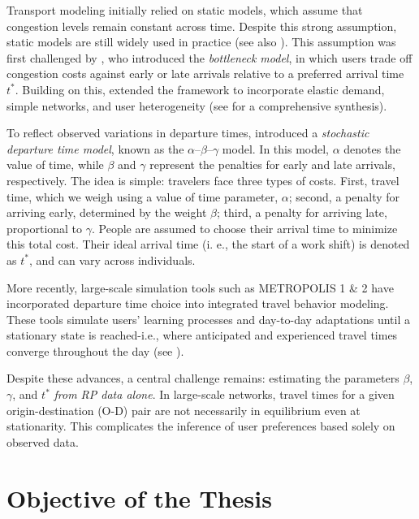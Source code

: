 Transport modeling initially relied on static models, which assume that congestion levels remain constant across time. Despite this strong assumption, static models are still widely used in practice (see also \textcite{duranton2011fundamental}). This assumption was first challenged by \textcite{Vickrey1963, Vickrey1969}, who introduced the \textit{bottleneck model}, in which users trade off congestion costs against early or late arrivals relative to a preferred arrival time \( t^* \). Building on this, \textcite{arnott1993structural} extended the framework to incorporate elastic demand, simple networks, and user heterogeneity (see \textcite{Li2020} for a comprehensive synthesis).

To reflect observed variations in departure times, \textcite{de1983stochastic} introduced a \textit{stochastic departure time model}, known as the \(\alpha\)–\(\beta\)–\(\gamma\) model. In this model, \(\alpha\) denotes the value of time, while \(\beta\) and \(\gamma\) represent the penalties for early and late arrivals, respectively. The idea is simple: travelers face three types of costs. First, travel time, which we weigh using a value of time parameter,  \(\alpha\);
second, a penalty for arriving early, determined by the weight \(\beta\);
third, a penalty for arriving late, proportional to \(\gamma\).
People are assumed to choose their arrival time to minimize this total cost.
Their ideal arrival time (i. e., the start of a work shift) is denoted as $t^*$, and can vary across individuals. 

More recently, large-scale simulation tools such as METROPOLIS 1 \& 2 have incorporated departure time choice into integrated travel behavior modeling. These tools simulate users' learning processes and day-to-day adaptations until a stationary state is reached-i.e., where anticipated and experienced travel times converge throughout the day (see \textcite{javaudin2024metropolis2}).

Despite these advances, a central challenge remains: estimating the parameters \(\beta\), \(\gamma\), and \( t^* \) \textit{from RP data alone}. In large-scale networks, travel times for a given origin-destination (O-D) pair are not necessarily in equilibrium even at stationarity. This complicates the inference of user preferences based solely on observed data.

\section{Objective of the Thesis}
\label{sec:thesis_obj}

